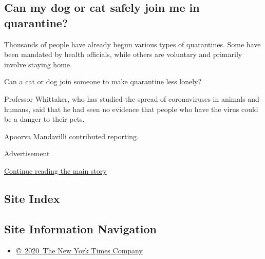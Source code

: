 \hypertarget{can-my-dog-or-cat-safely-join-me-in-quarantine}{%
\subsection{Can my dog or cat safely join me in
quarantine?}\label{can-my-dog-or-cat-safely-join-me-in-quarantine}}

Thousands of people have already begun various types of quarantines.
Some have been mandated by health officials, while others are voluntary
and primarily involve staying home.

Can a cat or dog join someone to make quarantine less lonely?

Professor Whittaker, who has studied the spread of coronaviruses in
animals and humans, said that he had seen no evidence that people who
have the virus could be a danger to their pets.

Apoorva Mandavilli contributed reporting.

Advertisement

\protect\hyperlink{after-bottom}{Continue reading the main story}

\hypertarget{site-index}{%
\subsection{Site Index}\label{site-index}}

\hypertarget{site-information-navigation}{%
\subsection{Site Information
Navigation}\label{site-information-navigation}}

\begin{itemize}
\tightlist
\item
  \href{https://help.nytimes3xbfgragh.onion/hc/en-us/articles/115014792127-Copyright-notice}{©~2020~The
  New York Times Company}
\end{itemize}

